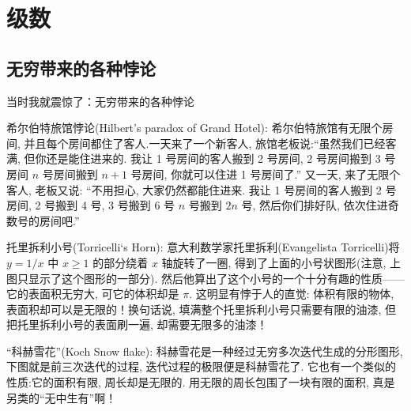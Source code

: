\documentclass[color=green,titlestyle=hang]{elegantbook}%
\begin{document}


\chapter{级数}

\section{无穷带来的各种悖论}
当时我就震惊了：无穷带来的各种悖论

\par 希尔伯特旅馆悖论(Hilbert's paradox of Grand Hotel): 希尔伯特旅馆有无限个房间, 并且每个房间都住了客人.一天来了一个新客人, 旅馆老板说:“虽然我们已经客满, 但你还是能住进来的. 我让 1 号房间的客人搬到 2 号房间, 2 号房间搬到 3 号房间 $n$ 号房间搬到 $n+1$ 号房间, 你就可以住进 1 号房间了.” 又一天, 来了无限个客人, 老板又说: “不用担心, 大家仍然都能住进来. 我让 1 号房间的客人搬到 2 号房间, 2 号搬到 4 号, 3 号搬到 6 号 $n$ 号搬到 $2n$ 号, 然后你们排好队, 依次住进奇数号的房间吧.”

\par 托里拆利小号(Torricelli‘s Horn): 意大利数学家托里拆利(Evangelista Torricelli)将 $y=1/x$ 中 $x\geqslant1$ 的部分绕着 $x$ 轴旋转了一圈, 得到了上面的小号状图形(注意, 上图只显示了这个图形的一部分). 然后他算出了这个小号的一个十分有趣的性质——它的表面积无穷大, 可它的体积却是 $\pi$. 这明显有悖于人的直觉: 体积有限的物体, 表面积却可以是无限的！换句话说, 填满整个托里拆利小号只需要有限的油漆, 但把托里拆利小号的表面刷一遍, 却需要无限多的油漆！

\par “科赫雪花”(Koch Snow flake): 科赫雪花是一种经过无穷多次迭代生成的分形图形, 下图就是前三次迭代的过程, 迭代过程的极限便是科赫雪花了. 它也有一个类似的性质:它的面积有限, 周长却是无限的. 用无限的周长包围了一块有限的面积, 真是另类的“无中生有”啊！

\end{document}
